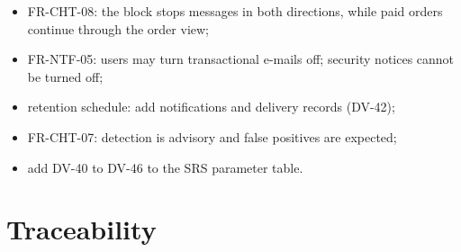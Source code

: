 \documentclass[11pt,a4paper]{article}
\begin{document}
\begin{enumerate}[label=\textbf{I-\arabic*}, leftmargin=*, nosep]
\begin{itemize}[nosep]
    \item FR-CHT-08: the block stops messages in both directions, while paid orders continue through the order view;
    \item FR-NTF-05: users may turn transactional e-mails off; security notices cannot be turned off;
    \item retention schedule: add notifications and delivery records (DV-42);
    \item FR-CHT-07: detection is advisory and false positives are expected;
    \item add DV-40 to DV-46 to the SRS parameter table.
  \end{itemize}
\end{enumerate}

\appendix
\section{Traceability}
\label{app:trace}
\end{document}
